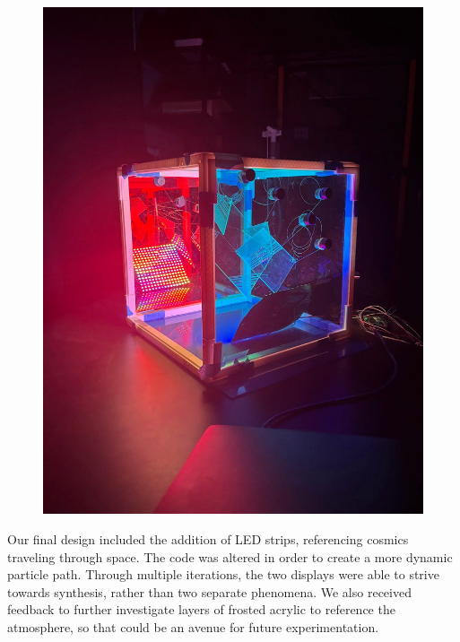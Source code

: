 \documentclass{article}
\begin{document}
\begin{figure}[h]
\begin{minipage}[b]{0.35\textwidth}
    \includegraphics[width=\textwidth]{images/unnamed13.jpg}
  \end{minipage}
\end{figure}

Our final design included the addition of LED strips, referencing cosmics traveling through space. The code was altered in order to create a more dynamic particle path. Through multiple iterations, the two displays were able to strive towards synthesis, rather than two separate phenomena. We also received feedback to further investigate layers of frosted acrylic to reference the atmosphere, so that could be an avenue for future experimentation. 
\end{document}

